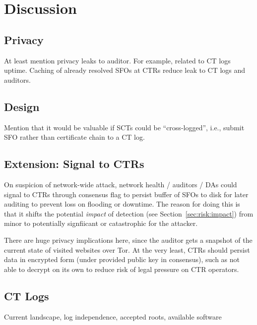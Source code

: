 \section{Discussion} \label{sec:discussion}

\subsection{Privacy}
At least mention privacy leaks to auditor. For example, related to CT logs
uptime. Caching of already resolved SFOs at CTRs reduce leak to CT logs and
auditors.

\subsection{Design}
Mention that it would be valuable if SCTs could be ``cross-logged'', i.e.,
submit SFO rather than certificate chain to a CT log.

\subsection{Extension: Signal to CTRs}
On suspicion of network-wide attack, network health / auditors / DAs could
signal to CTRs through consensus flag to persist buffer of SFOs to disk for
later auditing to prevent loss on flooding or downtime. The reason for doing
this is that it shifts the potential \emph{impact} of detection (see
Section~\ref{sec:risk:impact}) from minor to potentially signfiicant or
catastrophic for the attacker.

There are huge privacy implications here, since the auditor gets a snapshot of
the current state of visited websites over Tor. At the very least, CTRs should
persist data in encrypted form (under provided public key in consensus), such as
not able to decrypt on its own to reduce risk of legal pressure on CTR
operators.

\subsection{CT Logs}
Current landscape, log independence, accepted roots, available software
